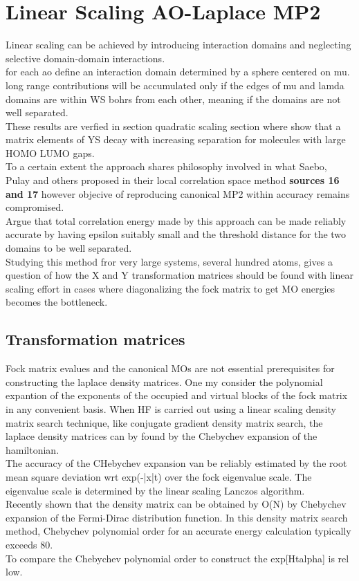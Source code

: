 \documentclass[10pt, draft]{article}
\begin{document}
\section{Linear Scaling AO-Laplace MP2}
Linear scaling can be achieved by introducing interaction domains and neglecting selective domain-domain interactions.  \\
for each ao define an interaction domain determined by a sphere centered on mu.  long range contributions will be accumulated only if the edges of mu and lamda domains are within WS bohrs from each other, meaning if the domains are not well separated.  \\
These results are verfied in section quadratic scaling section where show that a matrix elements of YS decay with increasing separation for molecules with large HOMO LUMO gaps.  \\
To a certain extent the approach shares philosophy involved in what Saebo, Pulay and others proposed in their local correlation space method \textbf{sources 16 and 17} however objecive of reproducing canonical MP2 within accuracy remains compromised.  \\
Argue that total correlation energy made by this approach can be made reliably accurate by having epsilon suitably small and the threshold distance for the two domains to be well separated.\\
Studying this method fror very large systems, several hundred atoms, gives a question of how the X and Y transformation matrices should be found with linear scaling effort in cases where diagonalizing the fock matrix to get MO energies becomes the bottleneck. 
\subsection{Transformation matrices}
Fock matrix evalues and the canonical MOs are not essential prerequisites for constructing the laplace density matrices. One my consider the polynomial expantion of the exponents of the occupied and virtual blocks of the fock matrix in any convenient basis.  When HF is carried out using a linear scaling density matrix search technique, like conjugate gradient density matrix search, the laplace density matrices can by found by the Chebychev expansion of the hamiltonian. \\
The accuracy of the CHebychev expansion van be reliably estimated by the root mean square deviation wrt exp(-|x|t) over the fock eigenvalue scale. The eigenvalue scale is determined by the linear scaling Lanczos algorithm.  \\
Recently shown that the density matrix can be obtained by O(N) by Chebychev expansion of the Fermi-Dirac distribution function.  In this  density matrix search method, Chebychev polynomial order for an accurate energy calculation typically exceeds 80.\\
To compare the Chebychev polynomial order to construct the exp[Htalpha] is rel low.  
\end{document}
